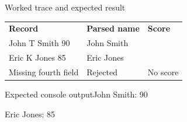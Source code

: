 \documentclass[10pt,aspectratio=169]{beamer}
\begin{document}
\begin{frame}[fragile,t]{Worked trace and expected result}
\small\renewcommand{\arraystretch}{1.4}
\begin{tabularx}{\textwidth}{>{\raggedright\arraybackslash}X>{\raggedright\arraybackslash}X>{\raggedright\arraybackslash}X}\rowcolor{navy}
\color{white}\bfseries Record & \color{white}\bfseries Parsed name & \color{white}\bfseries Score\\
John T Smith 90 & John Smith & 90\\
Eric K Jones 85 & Eric Jones & 85\\
Missing fourth field & Rejected & No score\\
\end{tabularx}\par\vspace{2mm}
\begin{block}{Expected console output}\ttfamily\footnotesize John Smith: 90\par Eric Jones: 85\end{block}
\end{frame}
\end{document}

